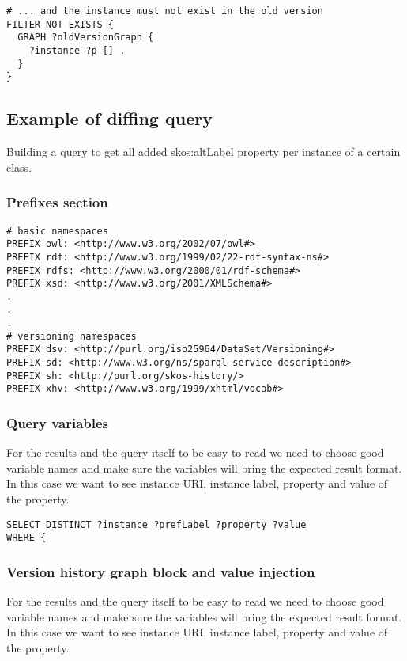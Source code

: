 \begin{lstlisting}
# ... and the instance must not exist in the old version
FILTER NOT EXISTS {
  GRAPH ?oldVersionGraph {
    ?instance ?p [] .
  }
}
\end{lstlisting}

\subsection{Example of diffing query}
Building a query to get all added skos:altLabel property per instance of a certain class.

\subsubsection{Prefixes section}

\begin{lstlisting}
# basic namespaces
PREFIX owl: <http://www.w3.org/2002/07/owl#>
PREFIX rdf: <http://www.w3.org/1999/02/22-rdf-syntax-ns#>
PREFIX rdfs: <http://www.w3.org/2000/01/rdf-schema#>
PREFIX xsd: <http://www.w3.org/2001/XMLSchema#>
.
.
.
# versioning namespaces
PREFIX dsv: <http://purl.org/iso25964/DataSet/Versioning#>
PREFIX sd: <http://www.w3.org/ns/sparql-service-description#>
PREFIX sh: <http://purl.org/skos-history/>
PREFIX xhv: <http://www.w3.org/1999/xhtml/vocab#>
\end{lstlisting}

\subsubsection{Query variables}
For the results and the query itself to be easy to read we need to choose good variable names and make sure the variables will bring the expected result format. In this case we want to see instance URI, instance label, property and value of the property.

\begin{lstlisting}
SELECT DISTINCT ?instance ?prefLabel ?property ?value 
WHERE {
\end{lstlisting}

\subsubsection{Version history graph block and value injection}
For the results and the query itself to be easy to read we need to choose good variable names and make sure the variables will bring the expected result format. In this case we want to see instance URI, instance label, property and value of the property.

